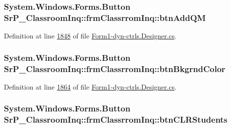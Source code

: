 \hypertarget{class_sr_p___classroom_inq_1_1frm_classrrom_inq_adda77c1d58e5db64040dff4228e6d97e}{
\subsubsection[{btn\-Add\-Q\-M}]{\setlength{\rightskip}{0pt plus 5cm}\-System.\-Windows.\-Forms.\-Button {\bf \-Sr\-P\-\_\-\-Classroom\-Inq\-::frm\-Classrrom\-Inq\-::btn\-Add\-Q\-M}}}
\label{class_sr_p___classroom_inq_1_1frm_classrrom_inq_adda77c1d58e5db64040dff4228e6d97e}


\-Definition at line \hyperlink{_form1-dyn-ctrls_8_designer_8cs_source_l01848}{1848} of file \hyperlink{_form1-dyn-ctrls_8_designer_8cs_source}{\-Form1-\/dyn-\/ctrls.\-Designer.\-cs}.

\hypertarget{class_sr_p___classroom_inq_1_1frm_classrrom_inq_a658aa508b7219ac91df61ae4e5b61e90}{
\subsubsection[{btn\-Bkgrnd\-Color}]{\setlength{\rightskip}{0pt plus 5cm}\-System.\-Windows.\-Forms.\-Button {\bf \-Sr\-P\-\_\-\-Classroom\-Inq\-::frm\-Classrrom\-Inq\-::btn\-Bkgrnd\-Color}}}
\label{class_sr_p___classroom_inq_1_1frm_classrrom_inq_a658aa508b7219ac91df61ae4e5b61e90}


\-Definition at line \hyperlink{_form1-dyn-ctrls_8_designer_8cs_source_l01864}{1864} of file \hyperlink{_form1-dyn-ctrls_8_designer_8cs_source}{\-Form1-\/dyn-\/ctrls.\-Designer.\-cs}.

\hypertarget{class_sr_p___classroom_inq_1_1frm_classrrom_inq_ad2bdef2e6f826a27d003c1a0df8bd2be}{
\subsubsection[{btn\-C\-L\-R\-Students}]{\setlength{\rightskip}{0pt plus 5cm}\-System.\-Windows.\-Forms.\-Button {\bf \-Sr\-P\-\_\-\-Classroom\-Inq\-::frm\-Classrrom\-Inq\-::btn\-C\-L\-R\-Students}}}
\label{class_sr_p___classroom_inq_1_1frm_classrrom_inq_ad2bdef2e6f826a27d003c1a0df8bd2be}


